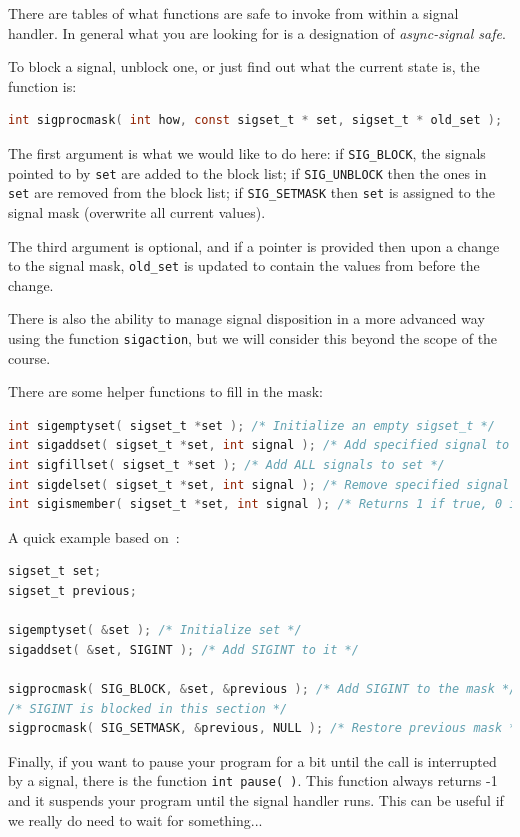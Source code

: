 \documentclass[a4paper]{report}
\begin{document}
There are tables of what functions are safe to invoke from within a signal handler. In general what you are looking for is a designation of \textit{async-signal safe}.

To block a signal, unblock one, or just find out what the current state is, the function is:
\begin{lstlisting}[language=C]
int sigprocmask( int how, const sigset_t * set, sigset_t * old_set );
\end{lstlisting}

The first argument is what we would like to do here: if \texttt{SIG\_BLOCK}, the signals pointed to by \texttt{set} are added to the block list; if \texttt{SIG\_UNBLOCK} then the ones in \texttt{set} are removed from the block list; if \texttt{SIG\_SETMASK} then \texttt{set} is assigned to the signal mask (overwrite all current values)\cite{lpi}.

The third argument is optional, and if a pointer is provided then upon a change to the signal mask, \texttt{old\_set} is updated to contain the values from before the change.

There is also the ability to manage signal disposition in a more advanced way using the function \texttt{sigaction}, but we will consider this beyond the scope of the course.

There are some helper functions to fill in the mask:
\begin{lstlisting}[language=C]
int sigemptyset( sigset_t *set ); /* Initialize an empty sigset_t */
int sigaddset( sigset_t *set, int signal ); /* Add specified signal to set */
int sigfillset( sigset_t *set ); /* Add ALL signals to set */
int sigdelset( sigset_t *set, int signal ); /* Remove specified signal from set */
int sigismember( sigset_t *set, int signal ); /* Returns 1 if true, 0 if false */
\end{lstlisting}

A quick example based on~\cite{lpi}:
\begin{lstlisting}[language=C]
sigset_t set;
sigset_t previous;

sigemptyset( &set ); /* Initialize set */
sigaddset( &set, SIGINT ); /* Add SIGINT to it */

sigprocmask( SIG_BLOCK, &set, &previous ); /* Add SIGINT to the mask */
/* SIGINT is blocked in this section */
sigprocmask( SIG_SETMASK, &previous, NULL ); /* Restore previous mask */

\end{lstlisting}

Finally, if you want to pause your program for a bit until the call is interrupted by a signal, there is the function \texttt{int pause( )}. This function always returns -1 and it suspends your program until the signal handler runs. This can be useful if we really do need to wait for something...
\end{document}
